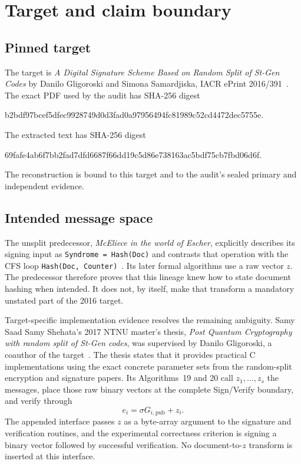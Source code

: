 \documentclass[10pt,a4paper]{article}
\begin{document}
\section{Target and claim boundary}

\subsection{Pinned target}

The target is \emph{A Digital Signature Scheme Based on Random Split of
St-Gen Codes} by Danilo Gligoroski and Simona Samardjiska, IACR ePrint
2016/391~\cite{stgen}.  The exact PDF used by the audit has SHA-256 digest
\begin{center}
\small\ttfamily
b2bdf97bcef5dfec9928749d0d3fad0a97956494fc81989c52cd4472dec5755e.
\end{center}
The extracted text has SHA-256 digest
\begin{center}
\small\ttfamily
69fafe4ab6f7bb2fad7dfd6687f66dd19c5d86e738163ac5bdf75cb7fbd06d6f.
\end{center}
The reconstruction is bound to this target and to the audit's sealed primary
and independent evidence.

\subsection{Intended message space}

The unsplit predecessor, \emph{McEliece in the world of Escher}, explicitly
describes its signing input as
\texttt{Syndrome = Hash(Doc)} and contrasts that operation with the CFS loop
\texttt{Hash(Doc, Counter)}~\cite{escher}.  Its later formal algorithms use a
raw vector $z$.  The predecessor therefore proves that this lineage knew how
to state document hashing when intended.  It does not, by itself, make that
transform a mandatory unstated part of the 2016 target.

Target-specific implementation evidence resolves the remaining ambiguity.
Samy Saad Samy Shehata's 2017 NTNU master's thesis, \emph{Post Quantum
Cryptography with random split of St-Gen codes}, was supervised by Danilo
Gligoroski, a coauthor of the target~\cite{shehata}.  The thesis states that it
provides practical C implementations using the exact concrete parameter sets
from the random-split encryption and signature papers.  Its Algorithms~19 and
20 call $z_1,\ldots,z_s$ the messages, place those raw binary vectors at the
complete Sign/Verify boundary, and verify through
\[
 e_i=\sigma G_{i,\mathrm{pub}}+z_i.
\]
The appended interface passes $z$ as a byte-array argument to the signature
and verification routines, and the experimental correctness criterion is
signing a binary vector followed by successful verification.  No
document-to-$z$ transform is inserted at this interface.
\end{document}
